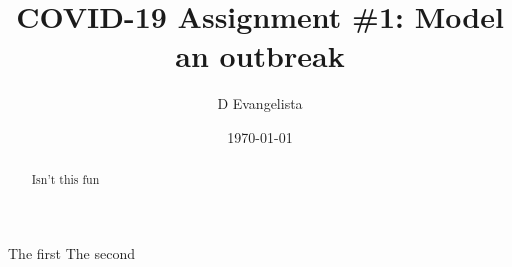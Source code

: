 \documentclass{exam}
\title{COVID-19 Assignment \#1: Model an outbreak}
\author{D Evangelista}
\date{\today}
\begin{document}
\maketitle

\begin{abstract}
  Isn't this fun
\end{abstract}

\begin{questions}
  \question The first
  \question The second
\end{questions}
\end{document}
